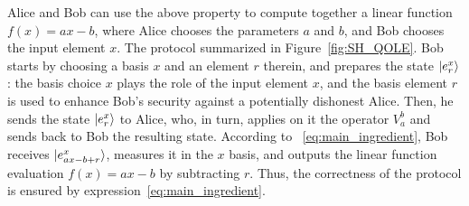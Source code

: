 Alice and Bob can use the above property to compute together a linear function $f(x) = ax - b$, where Alice chooses the parameters $a$ and $b$, and Bob chooses the input element $x$. The protocol summarized in Figure~\ref{fig:SH_QOLE}. Bob starts by choosing a basis $x$ and an element $r$ therein, and prepares the state $| e^x_r \rangle$:  the basis choice $x$ plays the role of the input element $x$, and the basis element $r$ is used to enhance Bob's security against a potentially dishonest Alice. Then, he sends the  state $| e^x_r \rangle$ to Alice, who, in turn, applies on it the operator $V^b_a$ and sends back to Bob the resulting state. According to ~\eqref{eq:main_ingredient}, Bob receives $| e^x_{ax - b + r} \rangle$,  measures it in the $x$ basis, and outputs the linear function evaluation $f(x) = ax-b$ by subtracting $r$. Thus, the correctness of the protocol is ensured by expression~\eqref{eq:main_ingredient}.
%    
%    
%    
%    
%     
%    
%    

